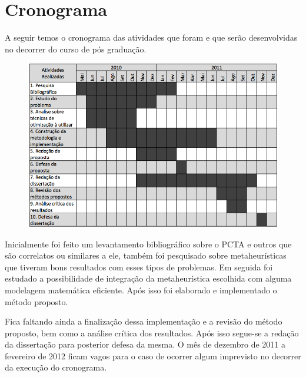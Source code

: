 \chapter{Cronograma}

A seguir temos o cronograma das atividades que foram e que serão desenvolvidas no decorrer do curso de pós graduação.
    
\begin{figure}[ht]
	\centering
	\includegraphics[scale=0.48]{./img/cronograma}
	\label{cronograma}
 \end{figure}
    
Inicialmente foi feito um levantamento bibliográfico sobre o PCTA e outros que são correlatos ou similares a ele, também foi pesquisado sobre metaheurísticas que tiveram bons resultados com esses tipos de problemas. Em seguida foi estudado a possibilidade de integração da metaheurística escolhida com alguma modelagem matemática eficiente. Após isso foi elaborado e implementado o método proposto.

Fica faltando ainda a finalização dessa implementação e a revisão do método proposto, bem como a análise crítica dos resultados. Após isso segue-se a redação da dissertação para posterior defesa da mesma. O mês de dezembro de 2011 a fevereiro de 2012 ficam vagos para o caso de ocorrer algum imprevisto no decorrer da execução do cronograma.

